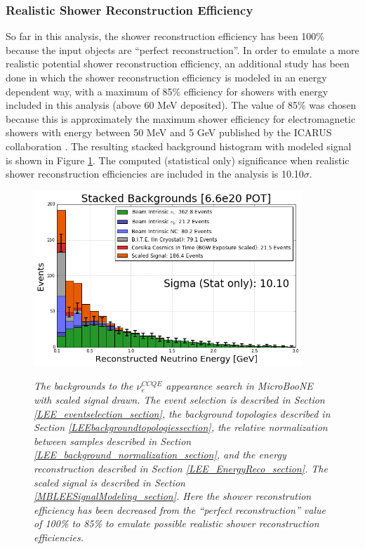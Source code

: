 \subsubsection{Realistic Shower Reconstruction Efficiency}
So far in this analysis, the shower reconstruction efficiency has been 100\% because the input objects are ``perfect reconstruction''. In order to emulate a more realistic potential shower reconstruction efficiency, an additional study has been done in which the shower reconstruction efficiency is modeled in an energy dependent way, with a maximum of 85\% efficiency for showers with energy included in this analysis (above 60 MeV deposited). The value of 85\% was chosen because this is approximately the maximum shower efficiency for electromagnetic showers with energy between 50 MeV and 5 GeV published by the ICARUS collaboration \cite{ICARUS_showereff_source}. The resulting stacked background histogram with modeled signal is shown in Figure \ref{LEE_recoemu_fullstack_fig}. The computed (statistical only) significance when realistic shower reconstruction efficiencies are included in the analysis is 10.10$\sigma$.

\begin{figure}[ht!]
\centering
\includegraphics[width=0.9\textwidth]{Figures/LEE_recoemu_fullstack_WithAnalysisCuts.png}\\
\caption{\textit{The backgrounds to the $\nu_e^{CCQE}$ appearance search in MicroBooNE with scaled signal drawn. The event selection is described in Section \ref{LEE_eventselection_section}, the background topologies described in Section \ref{LEEbackgroundtopologiessection}, the relative normalization between samples described in Section \ref{LEE_background_normalization_section}, and the energy reconstruction described in Section \ref{LEE_EnergyReco_section}. The scaled signal is described in Section \ref{MBLEESignalModeling_section}. Here the shower reconstrution efficiency has been decreased from the ``perfect reconstruction'' value of 100\% to 85\% to emulate possible realistic shower reconstruction efficiencies.}}
\label{LEE_recoemu_fullstack_fig}
\end{figure}

